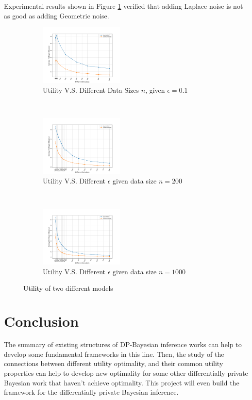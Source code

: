 \documentclass{article}
\begin{document}
Experimental results shown in Figure \ref{fig_geovslap} verified that adding Laplace noise is not as good as adding Geometric noise.  
\begin{figure}[t!]
    \centering
    \begin{subfigure}[t]{0.3\textwidth}
        \centering
        \includegraphics[height=1.2in]{datasize.png}
        \caption{Utility V.S. Different Data Sizes $n$, given $\epsilon = 0.1$}
    \end{subfigure}%
    ~ 
    \begin{subfigure}[t]{0.3\textwidth}
        \centering
        \includegraphics[height=1.2in]{eps_size200}
        \caption{Utility V.S. Different $\epsilon$ given data size $n = 200$}
    \end{subfigure}
    ~ 
    \begin{subfigure}[t]{0.3\textwidth}
        \centering
        \includegraphics[height=1.2in]{eps_size1000}
        \caption{Utility V.S. Different $\epsilon$ given data size $n = 1000$}
    \end{subfigure}
    \caption{Utility of two different models}
    \label{fig_geovslap}
\end{figure}
%

\section{Conclusion}
The summary of existing structures of DP-Bayesian inference works can help to develop some fundamental frameworks in this line. Then, the study of the connections between different utility optimality, and their common utility properties can help to develop new optimality for some other differentially private Bayesian work that haven't achieve optimality. This project will even build the framework for the differentially private Bayesian inference.


\newpage


\end{document}
